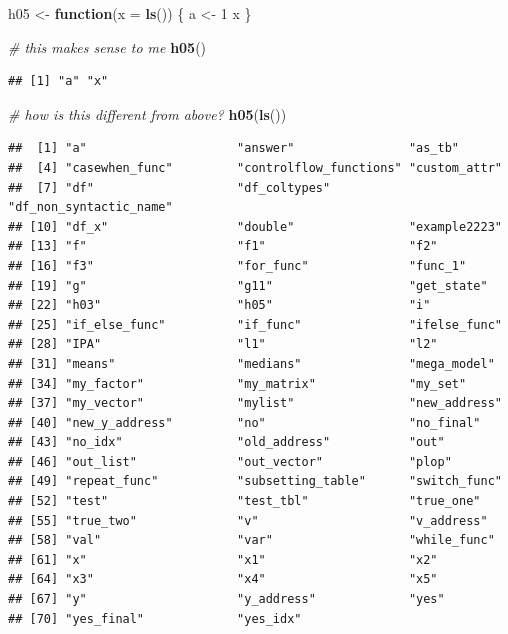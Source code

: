 \documentclass[]{book}
\newenvironment{Shaded}{\begin{snugshade}}{\end{snugshade}}
\newcommand{\CommentTok}[1]{\textcolor[rgb]{0.56,0.35,0.01}{\textit{#1}}}
\newcommand{\ControlFlowTok}[1]{\textcolor[rgb]{0.13,0.29,0.53}{\textbf{#1}}}
\newcommand{\DataTypeTok}[1]{\textcolor[rgb]{0.13,0.29,0.53}{#1}}
\newcommand{\DecValTok}[1]{\textcolor[rgb]{0.00,0.00,0.81}{#1}}
\newcommand{\KeywordTok}[1]{\textcolor[rgb]{0.13,0.29,0.53}{\textbf{#1}}}
\newcommand{\NormalTok}[1]{#1}
\newcommand{\StringTok}[1]{\textcolor[rgb]{0.31,0.60,0.02}{#1}}
\begin{document}
\begin{Shaded}
\begin{Highlighting}[]
\NormalTok{h05 <-}\StringTok{ }\ControlFlowTok{function}\NormalTok{(}\DataTypeTok{x =} \KeywordTok{ls}\NormalTok{()) \{}
\NormalTok{  a <-}\StringTok{ }\DecValTok{1}
\NormalTok{  x}
\NormalTok{\}}

\CommentTok{# this makes sense to me}
\KeywordTok{h05}\NormalTok{()}
\end{Highlighting}
\end{Shaded}

\begin{verbatim}
## [1] "a" "x"
\end{verbatim}

\begin{Shaded}
\begin{Highlighting}[]
\CommentTok{# how is this different from above?}
\KeywordTok{h05}\NormalTok{(}\KeywordTok{ls}\NormalTok{())}
\end{Highlighting}
\end{Shaded}

\begin{verbatim}
##  [1] "a"                     "answer"                "as_tb"                
##  [4] "casewhen_func"         "controlflow_functions" "custom_attr"          
##  [7] "df"                    "df_coltypes"           "df_non_syntactic_name"
## [10] "df_x"                  "double"                "example2223"          
## [13] "f"                     "f1"                    "f2"                   
## [16] "f3"                    "for_func"              "func_1"               
## [19] "g"                     "g11"                   "get_state"            
## [22] "h03"                   "h05"                   "i"                    
## [25] "if_else_func"          "if_func"               "ifelse_func"          
## [28] "IPA"                   "l1"                    "l2"                   
## [31] "means"                 "medians"               "mega_model"           
## [34] "my_factor"             "my_matrix"             "my_set"               
## [37] "my_vector"             "mylist"                "new_address"          
## [40] "new_y_address"         "no"                    "no_final"             
## [43] "no_idx"                "old_address"           "out"                  
## [46] "out_list"              "out_vector"            "plop"                 
## [49] "repeat_func"           "subsetting_table"      "switch_func"          
## [52] "test"                  "test_tbl"              "true_one"             
## [55] "true_two"              "v"                     "v_address"            
## [58] "val"                   "var"                   "while_func"           
## [61] "x"                     "x1"                    "x2"                   
## [64] "x3"                    "x4"                    "x5"                   
## [67] "y"                     "y_address"             "yes"                  
## [70] "yes_final"             "yes_idx"
\end{verbatim}
\end{document}
